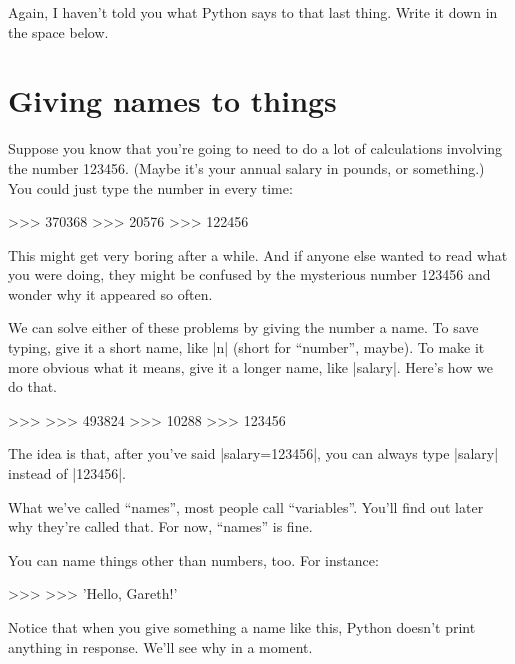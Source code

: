 \documentclass[pdftex]{wsheet}
\begin{document}
Again, I haven't told you what Python says to that last thing.
Write it down in the space below.
\vspace{1cm}

\section{Giving names to things}
Suppose you know that you're going to need to do a lot of
calculations involving the number 123456. (Maybe it's your
annual salary in pounds, or something.) You could just type
the number in every time:

\begin{interaction}
>>> 
370368
>>> 
20576
>>> 
122456
\end{interaction}

This might get very boring after a while. And if anyone else
wanted to read what you were doing, they might be confused by
the mysterious number 123456 and wonder why it appeared so
often.

We can solve either of these problems by giving the number a name.
To save typing, give it a short name, like |n| (short for ``number'',
maybe). To make it more obvious what it means, give it a longer
name, like |salary|. Here's how we do that.

\begin{interaction}
>>> 
>>> 
493824
>>> 
10288
>>> 
123456
\end{interaction}

The idea is that, after you've said |salary=123456|, you can
always type |salary| instead of |123456|.

\begin{note}
          What we've called ``names'', most people call ``variables''.
          You'll find out later why they're called that. For now,
          ``names'' is fine.
\end{note}

You can name things other than numbers, too. For instance:

\begin{interaction}
>>> 
>>> 
'Hello, Gareth!'
\end{interaction}

Notice that when you give something a name like this, Python doesn't 
print anything in response. We'll see why in a moment.
\end{document}
